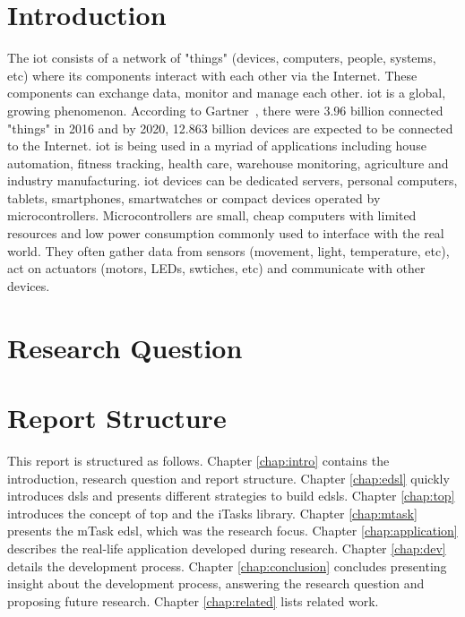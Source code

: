 \section{Introduction}
The \ac{iot} consists of a network of "things" (devices, computers, people, systems, etc) where its components interact with each other via the Internet. These components can exchange data, monitor and manage each other. \ac{iot} is a global, growing phenomenon. According to Gartner~\cite{iot_numbers}, there were 3.96 billion connected "things" in 2016 and by 2020, 12.863 billion devices are expected to be connected to the Internet. \ac{iot} is being used in a myriad of applications including house automation, fitness tracking, health care, warehouse monitoring, agriculture and industry manufacturing. \ac{iot} devices can be dedicated servers, personal computers, tablets, smartphones, smartwatches or compact devices operated by microcontrollers. Microcontrollers are small, cheap computers with limited resources and low power consumption commonly used to interface with the real world. They often gather data from sensors (movement, light, temperature, etc), act on actuators (motors, LEDs, swtiches, etc) and communicate with other devices.





\section{Research Question}
\section{Report Structure}

This report is structured as follows. Chapter \ref{chap:intro} contains the introduction, research question and report structure. Chapter \ref{chap:edsl} quickly introduces \acp{dsl} and presents different strategies to build \acp{edsl}. Chapter \ref{chap:top} introduces the concept of \ac{top} and the iTasks library. Chapter \ref{chap:mtask} presents the mTask \ac{edsl}, which was the research focus. Chapter \ref{chap:application} describes the real-life application developed during research. Chapter \ref{chap:dev} details the development process. Chapter \ref{chap:conclusion} concludes presenting insight about the development process, answering the research question and proposing future research. Chapter \ref{chap:related} lists related work.

